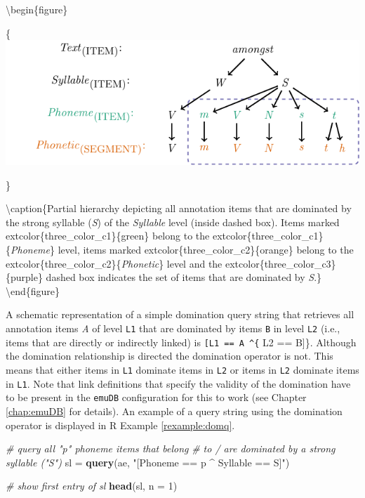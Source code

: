 \documentclass[]{book}
\newenvironment{Shaded}{\begin{snugshade}}{\end{snugshade}}
\newcommand{\CommentTok}[1]{\textcolor[rgb]{0.56,0.35,0.01}{\textit{#1}}}
\newcommand{\DataTypeTok}[1]{\textcolor[rgb]{0.13,0.29,0.53}{#1}}
\newcommand{\DecValTok}[1]{\textcolor[rgb]{0.00,0.00,0.81}{#1}}
\newcommand{\KeywordTok}[1]{\textcolor[rgb]{0.13,0.29,0.53}{\textbf{#1}}}
\newcommand{\NormalTok}[1]{#1}
\newcommand{\StringTok}[1]{\textcolor[rgb]{0.31,0.60,0.02}{#1}}
\theoremstyle{definition}
\theoremstyle{definition}
\theoremstyle{definition}
\theoremstyle{remark}
\begin{document}
\textbackslash{}begin\{figure\}

\{\centering \includegraphics[width=0.75\linewidth]{pics/amongstHierDomination}

\}

\textbackslash{}caption\{Partial hierarchy depicting all annotation
items that are dominated by the strong syllable (\emph{S}) of the
\emph{Syllable} level (inside dashed box). Items marked
extcolor\{three\_color\_c1\}\{green\} belong to the
extcolor\{three\_color\_c1\}\{\emph{Phoneme}\} level, items marked
extcolor\{three\_color\_c2\}\{orange\} belong to the
extcolor\{three\_color\_c2\}\{\emph{Phonetic}\} level and the
extcolor\{three\_color\_c3\}\{purple\} dashed box indicates the set of
items that are dominated by \emph{S}.\}\label{fig:amongstHierDomintation}
\textbackslash{}end\{figure\}

A schematic representation of a simple domination query string that
retrieves all annotation items \emph{A} of level \texttt{L1} that are
dominated by items \texttt{B} in level \texttt{L2} (i.e., items that are
directly or indirectly linked) is \texttt{{[}L1\ ==\ A\ \^{}\{} L2 ==
B{]}\}. Although the domination relationship is directed the domination
operator is not. This means that either items in \texttt{L1} dominate
items in \texttt{L2} or items in \texttt{L2} dominate items in
\texttt{L1}. Note that link definitions that specify the validity of the
domination have to be present in the \texttt{emuDB} configuration for
this to work (see Chapter \ref{chap:emuDB} for details). An example of a
query string using the domination operator is displayed in R Example
\ref{rexample:domq}.

\begin{Shaded}
\begin{Highlighting}[]
\CommentTok{# query all "p" phoneme items that belong}
\CommentTok{# to / are dominated by a strong syllable ("S")}
\NormalTok{sl =}\StringTok{ }\KeywordTok{query}\NormalTok{(ae, }\StringTok{"[Phoneme == p ^ Syllable == S]"}\NormalTok{)}

\CommentTok{# show first entry of sl}
\KeywordTok{head}\NormalTok{(sl, }\DataTypeTok{n =} \DecValTok{1}\NormalTok{)}
\end{Highlighting}
\end{Shaded}
\end{document}
